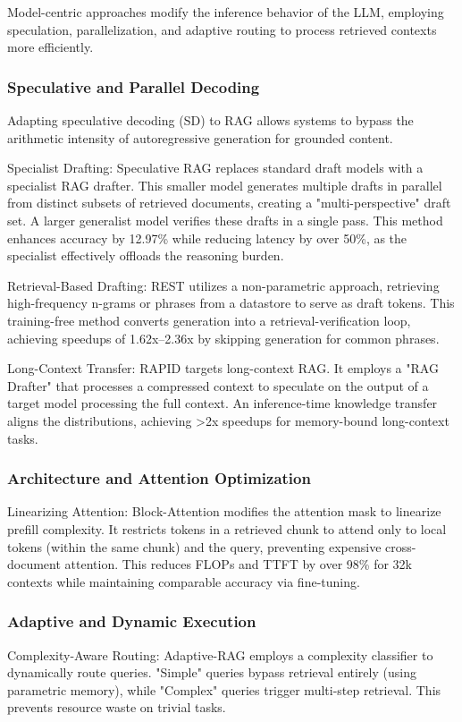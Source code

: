 \documentclass[11pt]{article}
\begin{document}
Model-centric approaches modify the inference behavior of the LLM, employing speculation, parallelization, and adaptive routing to process retrieved contexts more efficiently.

\subsubsection{Speculative and Parallel Decoding}

Adapting speculative decoding (SD) to RAG allows systems to bypass the arithmetic intensity of autoregressive generation for grounded content.

Specialist Drafting: Speculative RAG \citep{wang2024speculative} replaces standard draft models with a specialist RAG drafter. This smaller model generates multiple drafts in parallel from distinct subsets of retrieved documents, creating a "multi-perspective" draft set. A larger generalist model verifies these drafts in a single pass. This method enhances accuracy by 12.97\% while reducing latency by over 50\%, as the specialist effectively offloads the reasoning burden.

Retrieval-Based Drafting: REST \citep{he2024rest} utilizes a non-parametric approach, retrieving high-frequency n-grams or phrases from a datastore to serve as draft tokens. This training-free method converts generation into a retrieval-verification loop, achieving speedups of 1.62x–2.36x by skipping generation for common phrases.

Long-Context Transfer: RAPID \citep{chenrapid} targets long-context RAG. It employs a "RAG Drafter" that processes a compressed context to speculate on the output of a target model processing the full context. An inference-time knowledge transfer aligns the distributions, achieving >2x speedups for memory-bound long-context tasks.

\subsubsection{Architecture and Attention Optimization}
Linearizing Attention: Block-Attention \citep{ma2024block} modifies the attention mask to linearize prefill complexity. It restricts tokens in a retrieved chunk to attend only to local tokens (within the same chunk) and the query, preventing expensive cross-document attention. This reduces FLOPs and TTFT by over 98\% for 32k contexts while maintaining comparable accuracy via fine-tuning.

\subsubsection{Adaptive and Dynamic Execution}
Complexity-Aware Routing: Adaptive-RAG \citep{jeong2024adaptive} employs a complexity classifier to dynamically route queries. "Simple" queries bypass retrieval entirely (using parametric memory), while "Complex" queries trigger multi-step retrieval. This prevents resource waste on trivial tasks.
\end{document}
